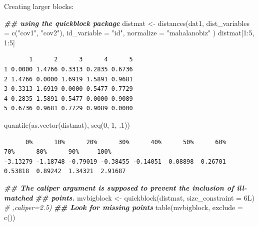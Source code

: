 \documentclass[
  12pt,
]{book}
\newenvironment{Shaded}{\begin{snugshade}}{\end{snugshade}}
\newcommand{\AttributeTok}[1]{\textcolor[rgb]{0.77,0.63,0.00}{#1}}
\newcommand{\CommentTok}[1]{\textcolor[rgb]{0.56,0.35,0.01}{\textit{#1}}}
\newcommand{\DecValTok}[1]{\textcolor[rgb]{0.00,0.00,0.81}{#1}}
\newcommand{\DocumentationTok}[1]{\textcolor[rgb]{0.56,0.35,0.01}{\textbf{\textit{#1}}}}
\newcommand{\FunctionTok}[1]{\textcolor[rgb]{0.00,0.00,0.00}{#1}}
\newcommand{\NormalTok}[1]{#1}
\newcommand{\OtherTok}[1]{\textcolor[rgb]{0.56,0.35,0.01}{#1}}
\newcommand{\SpecialCharTok}[1]{\textcolor[rgb]{0.00,0.00,0.00}{#1}}
\newcommand{\StringTok}[1]{\textcolor[rgb]{0.31,0.60,0.02}{#1}}
\theoremstyle{definition}
\theoremstyle{definition}
\theoremstyle{definition}
\theoremstyle{remark}
\begin{document}
Creating larger blocks:

\begin{Shaded}
\begin{Highlighting}[]
\DocumentationTok{\#\# using the quickblock package}
\NormalTok{distmat }\OtherTok{\textless{}{-}} \FunctionTok{distances}\NormalTok{(dat1,}
  \AttributeTok{dist\_variables =} \FunctionTok{c}\NormalTok{(}\StringTok{"cov1"}\NormalTok{, }\StringTok{"cov2"}\NormalTok{), }\AttributeTok{id\_variable =}
    \StringTok{"id"}\NormalTok{, }\AttributeTok{normalize =} \StringTok{"mahalanobiz"}
\NormalTok{)}
\NormalTok{distmat[}\DecValTok{1}\SpecialCharTok{:}\DecValTok{5}\NormalTok{, }\DecValTok{1}\SpecialCharTok{:}\DecValTok{5}\NormalTok{]}
\end{Highlighting}
\end{Shaded}

\begin{verbatim}
       1      2      3      4      5
1 0.0000 1.4766 0.3313 0.2835 0.6736
2 1.4766 0.0000 1.6919 1.5891 0.9681
3 0.3313 1.6919 0.0000 0.5477 0.7729
4 0.2835 1.5891 0.5477 0.0000 0.9089
5 0.6736 0.9681 0.7729 0.9089 0.0000
\end{verbatim}

\begin{Shaded}
\begin{Highlighting}[]
\FunctionTok{quantile}\NormalTok{(}\FunctionTok{as.vector}\NormalTok{(distmat), }\FunctionTok{seq}\NormalTok{(}\DecValTok{0}\NormalTok{, }\DecValTok{1}\NormalTok{, .}\DecValTok{1}\NormalTok{))}
\end{Highlighting}
\end{Shaded}

\begin{verbatim}
      0%      10%      20%      30%      40%      50%      60%      70%      80%      90%     100% 
-3.13279 -1.18748 -0.79019 -0.38455 -0.14051  0.08898  0.26701  0.53818  0.89242  1.34321  2.91687 
\end{verbatim}

\begin{Shaded}
\begin{Highlighting}[]
\DocumentationTok{\#\# The caliper argument is supposed to prevent the inclusion of ill{-}matched}
\DocumentationTok{\#\# points.}
\NormalTok{mvbigblock }\OtherTok{\textless{}{-}} \FunctionTok{quickblock}\NormalTok{(distmat, }\AttributeTok{size\_constraint =}\NormalTok{ 6L) }\CommentTok{\# ,caliper=2.5)}
\DocumentationTok{\#\# Look for missing points}
\FunctionTok{table}\NormalTok{(mvbigblock, }\AttributeTok{exclude =} \FunctionTok{c}\NormalTok{())}
\end{Highlighting}
\end{Shaded}
\end{document}

